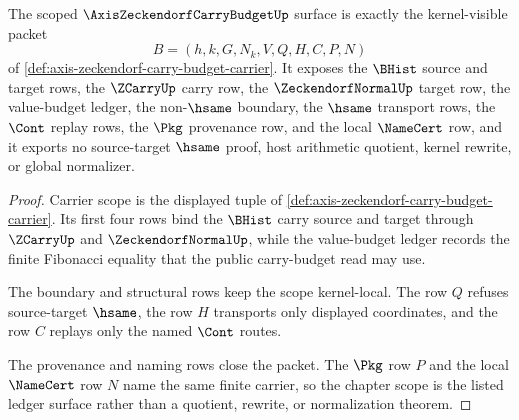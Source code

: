 \begin{theorem}
\label{thm:axis-zeckendorf-carry-budget-scope}
The scoped $\AxisZeckendorfCarryBudgetUp$ surface is exactly the kernel-visible packet
$$
B=(h,k,G,N_k,V,Q,H,C,P,N)
$$
of \autoref{def:axis-zeckendorf-carry-budget-carrier}. It exposes the $\BHist$ source and target rows, the $\ZCarryUp$ carry row, the $\ZeckendorfNormalUp$ target row, the value-budget ledger, the non-$\hsame$ boundary, the $\hsame$ transport rows, the $\Cont$ replay rows, the $\Pkg$ provenance row, and the local $\NameCert$ row, and it exports no source-target $\hsame$ proof, host arithmetic quotient, kernel rewrite, or global normalizer.
\end{theorem}
\begin{proof}
Carrier scope is the displayed tuple of \autoref{def:axis-zeckendorf-carry-budget-carrier}. Its first four rows bind the $\BHist$ carry source and target through $\ZCarryUp$ and $\ZeckendorfNormalUp$, while the value-budget ledger records the finite Fibonacci equality that the public carry-budget read may use.

The boundary and structural rows keep the scope kernel-local. The row $Q$ refuses source-target $\hsame$, the row $H$ transports only displayed coordinates, and the row $C$ replays only the named $\Cont$ routes.

The provenance and naming rows close the packet. The $\Pkg$ row $P$ and the local $\NameCert$ row $N$ name the same finite carrier, so the chapter scope is the listed ledger surface rather than a quotient, rewrite, or normalization theorem.
\end{proof}


